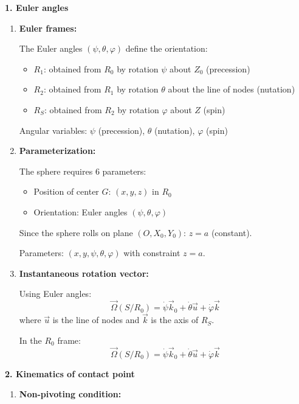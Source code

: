 \documentclass[12pt]{article}
\begin{document}
\begin{correctionbox}
\textbf{1. Euler angles}

\begin{enumerate}
    \item[a)] \textbf{Euler frames:}
    
    The Euler angles $(\psi, \theta, \varphi)$ define the orientation:
    \begin{itemize}
        \item $R_1$: obtained from $R_0$ by rotation $\psi$ about $Z_0$ (precession)
        \item $R_2$: obtained from $R_1$ by rotation $\theta$ about the line of nodes (nutation)
        \item $R_S$: obtained from $R_2$ by rotation $\varphi$ about $Z$ (spin)
    \end{itemize}
    
    Angular variables: $\psi$ (precession), $\theta$ (nutation), $\varphi$ (spin)
    
    \item[b)] \textbf{Parameterization:}
    
    The sphere requires 6 parameters:
    \begin{itemize}
        \item Position of center $G$: $(x, y, z)$ in $R_0$
        \item Orientation: Euler angles $(\psi, \theta, \varphi)$
    \end{itemize}
    
    Since the sphere rolls on plane $(O, X_0, Y_0)$: $z = a$ (constant).
    
    Parameters: $(x, y, \psi, \theta, \varphi)$ with constraint $z = a$.
    
    \item[c)] \textbf{Instantaneous rotation vector:}
    
    Using Euler angles:
    $$\vec{\Omega}(S/R_0) = \dot{\psi}\vec{k}_0 + \dot{\theta}\vec{u} + \dot{\varphi}\vec{k}$$
    where $\vec{u}$ is the line of nodes and $\vec{k}$ is the axis of $R_S$.
    
    In the $R_0$ frame:
    $$\vec{\Omega}(S/R_0) = \dot{\psi}\vec{k}_0 + \dot{\theta}\vec{u} + \dot{\varphi}\vec{k}$$
\end{enumerate}

\textbf{2. Kinematics of contact point}

\begin{enumerate}
    \item[a)] \textbf{Non-pivoting condition:}
    

\end{enumerate}
\end{correctionbox}
\end{document}
